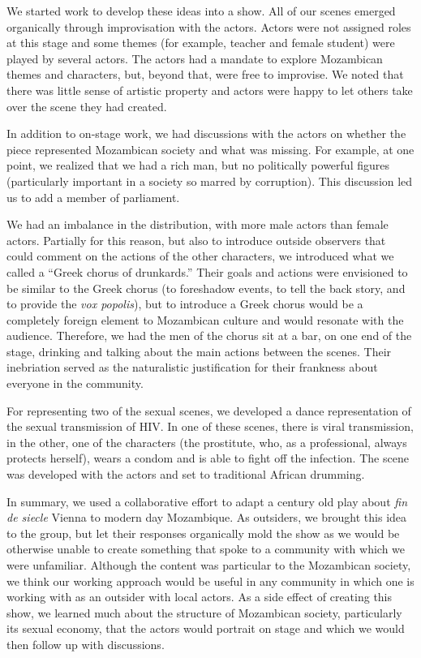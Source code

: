 \documentclass[article,twocolumn,twoside]{memoir}
\begin{document}
We started work to develop these ideas into a show. All of our scenes emerged
organically through improvisation with the actors. Actors were not assigned
roles at this stage and some themes (for example, teacher and female student)
were played by several actors. The actors had a mandate to explore Mozambican
themes and characters, but, beyond that, were free to improvise. We noted that
there was little sense of artistic property and actors were happy to let others
take over the scene they had created.

In addition to on-stage work, we had discussions with the actors on whether the
piece represented Mozambican society and what was missing. For example, at one
point, we realized that we had a rich man, but no politically powerful figures
(particularly important in a society so marred by corruption).  This discussion
led us to add a member of parliament.

We had an imbalance in the distribution, with more male actors than female
actors. Partially for this reason, but also to introduce outside observers that
could comment on the actions of the other characters, we introduced what we
called a ``Greek chorus of drunkards.'' Their goals and actions were envisioned
to be similar to the Greek chorus (to foreshadow events, to tell the back story,
and to provide the \textit{vox popolis}), but to introduce a Greek chorus would
be a completely foreign element to Mozambican culture and would resonate with
the audience. Therefore, we had the men of the chorus sit at a bar, on one end
of the stage, drinking and talking about the main actions between the scenes.
Their inebriation served as the naturalistic justification for their frankness
about everyone in the community.

For representing two of the sexual scenes, we developed a dance representation
of the sexual transmission of HIV. In one of these scenes, there is viral
transmission, in the other, one of the characters (the prostitute, who, as a
professional, always protects herself), wears a condom and is able to fight off
the infection. The scene was developed with the actors and set to traditional
African drumming.

\bigskip
\bigskip
\bigskip

In summary, we used a collaborative effort to adapt a century old play about
\textit{fin de siecle} Vienna to modern day Mozambique. As outsiders, we
brought this idea to the group, but let their responses organically mold the
show as we would be otherwise unable to create something that spoke to a
community with which we were unfamiliar. Although the content was particular to
the Mozambican society, we think our working approach would be useful in any
community in which one is working with as an outsider with local actors. As a
side effect of creating this show, we learned much about the structure of
Mozambican society, particularly its sexual economy, that the actors would
portrait on stage and which we would then follow up with discussions.
\end{document}
